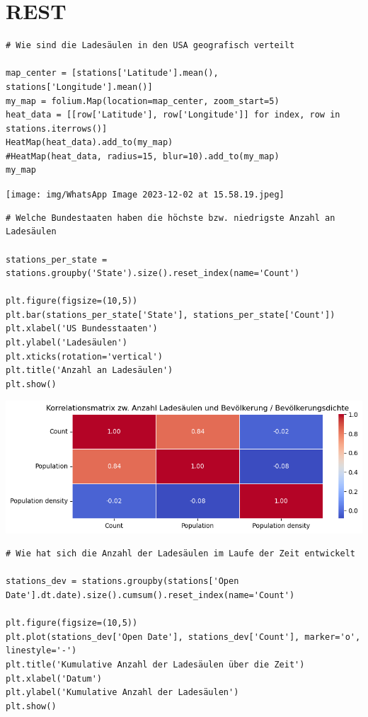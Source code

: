 
\newpage
\section{REST}
\newpage


\begin{verbatim}
# Wie sind die Ladesäulen in den USA geografisch verteilt

map_center = [stations['Latitude'].mean(), stations['Longitude'].mean()]
my_map = folium.Map(location=map_center, zoom_start=5)
heat_data = [[row['Latitude'], row['Longitude']] for index, row in stations.iterrows()]
HeatMap(heat_data).add_to(my_map)
#HeatMap(heat_data, radius=15, blur=10).add_to(my_map)
my_map
\end{verbatim}

\begin{center}
\texttt{[image: img/WhatsApp Image 2023-12-02 at 15.58.19.jpeg]}
\end{center}

\begin{verbatim}
# Welche Bundestaaten haben die höchste bzw. niedrigste Anzahl an Ladesäulen

stations_per_state = stations.groupby('State').size().reset_index(name='Count')

plt.figure(figsize=(10,5))
plt.bar(stations_per_state['State'], stations_per_state['Count'])
plt.xlabel('US Bundesstaaten')
plt.ylabel('Ladesäulen')
plt.xticks(rotation='vertical')
plt.title('Anzahl an Ladesäulen')
plt.show()
\end{verbatim}

\begin{center}
\includegraphics[scale=0.6]{img/output_7_0.png}
\end{center}

\begin{verbatim}
# Wie hat sich die Anzahl der Ladesäulen im Laufe der Zeit entwickelt

stations_dev = stations.groupby(stations['Open Date'].dt.date).size().cumsum().reset_index(name='Count')

plt.figure(figsize=(10,5))
plt.plot(stations_dev['Open Date'], stations_dev['Count'], marker='o', linestyle='-')
plt.title('Kumulative Anzahl der Ladesäulen über die Zeit')
plt.xlabel('Datum')
plt.ylabel('Kumulative Anzahl der Ladesäulen')
plt.show()
\end{verbatim}


